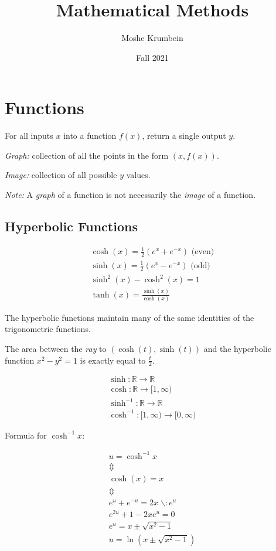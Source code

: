 \documentclass[00_complete]{subfiles}
\title{Mathematical Methods}
\author{Moshe Krumbein}
\date{Fall 2021}
\begin{document}

\section{Functions}

\begin{definition}
For all inputs $x$ into a function $f(x)$, return a single output $y$.

\emph{Graph:} collection of all the points in the form $(x,f(x))$.

\emph{Image:} collection of all possible $y$ values.

\emph{Note:} A \emph{graph} of a function is not necessarily the \emph{image} of a function.
\end{definition}

\subsection{Hyperbolic Functions}

$$
\begin{gathered}
    \cosh(x)=\frac{1}{2}\left(e^x+e^{-x}\right) \text{ (even)} \\
    \sinh(x)=\frac{1}{2}\left(e^x-e^{-x}\right) \text{ (odd)} \\
    \sinh^2(x)-\cosh^2(x) = 1\\
    \tanh(x) = \frac{\sinh(x)}{\cosh(x)}
\end{gathered}
$$

The hyperbolic functions maintain many of the same identities of the
trigonometric functions.

The area between the \emph{ray} to $(\cosh(t), \sinh(t))$ and the hyperbolic
function $x^2-y^2 = 1$ is exactly equal to $\frac{t}{2}$.

$$
\begin{gathered}
    \sinh: \mathbb{R} \to \mathbb{R} \\
    \cosh: \mathbb{R} \to [1, \infty) \\
    \sinh^{-1}: \mathbb{R} \to \mathbb{R} \\
    \cosh^{-1}: [1, \infty) \to [0, \infty)
\end{gathered}
$$

Formula for $\cosh^{-1}x$:

$$
\begin{gathered}
    u = \cosh^{-1}x \\
    \Updownarrow \\
    \cosh(x) = x \\ \Updownarrow \\
    e^u + e^{-u} =2x \; \backslash : e^u\\
    e^{2u} + 1 - 2xe^u = 0 \\
    e^u = x \pm \sqrt{x^2-1} \\
    u = \ln(x\pm\sqrt{x^2-1}) \\
\end{gathered}
$$
\end{document}
